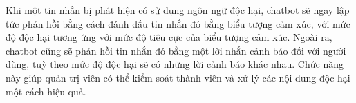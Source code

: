 Khi một tin nhắn bị phát hiện có sử dụng ngôn ngữ độc hại, chatbot sẽ ngay lập tức phản hồi bằng cách đánh dấu tin nhắn đó bằng biểu tượng cảm xúc, với mức độ độc hại tương ứng với mức độ tiêu cực của biểu tượng cảm xúc. Ngoài ra, chatbot cũng sẽ phản hồi tin nhắn đó bằng một lời nhắn cảnh báo đối với người dùng, tuỳ theo mức độ độc hại sẽ có những lời cảnh báo khác nhau. Chức năng này giúp quản trị viên có thể kiểm soát thành viên và xử lý các nội dung độc hại một cách hiệu quả.